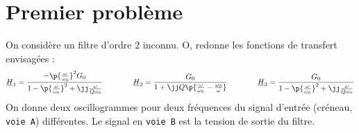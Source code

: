 \documentclass[a4paper,french,bookmarks]{article}
\begin{document}
    \renewcommand{\thesection}{\Roman{section}}
    \renewcommand{\labelenumi}{\thesection.\arabic{enumi}.}
    \renewcommand*{\labelenumii}{\thesection.\arabic{enumi}.\arabic{enumii}.}
    
    
    \section{Premier problème}
    
    On considère un filtre d'ordre $2$ inconnu. O, redonne les fonctions de transfert envisagées :
    \[ \underline{H}_1 = \frac{-\p{\frac{\omega}{\omega_0}}^2G_0}{1 - \p{\frac{\omega}{\omega_0}}^2 + \jj\frac{\omega}{Q\omega_0}} \qquad\qquad \underline{H}_2 = \frac{G_0}{1 + \jj Q\p{\frac{\omega}{\omega_0} - \frac{\omega_0}{\omega}}} \qquad\qquad \underline{H}_3 = \dfrac{G_0}{1 - \p{\frac{\omega}{\omega_0}}^2 + \jj\frac{\omega}{Q\omega_0}}\]
    On donne deux oscillogrammes pour deux fréquences du signal d'entrée (créneau, \texttt{voie A}) différentes. Le signal en \texttt{voie B} est la tension de sortie du filtre.
    
\end{document}

